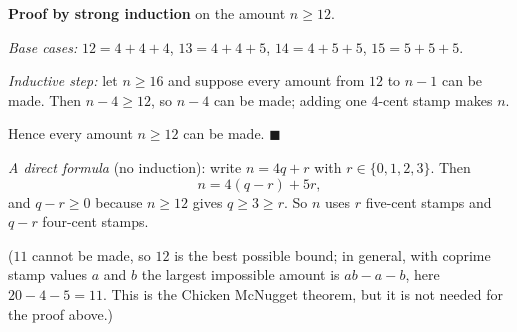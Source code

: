 \textbf{Proof by strong induction} on the amount $n\ge12$.

\emph{Base cases:} $12=4+4+4$, $13=4+4+5$, $14=4+5+5$, $15=5+5+5$.

\emph{Inductive step:} let $n\ge16$ and suppose every amount from $12$ to $n-1$ can be made. Then $n-4\ge12$, so $n-4$ can be made; adding one $4$-cent stamp makes $n$.

Hence every amount $n\ge12$ can be made. $\blacksquare$

\emph{A direct formula} (no induction): write $n=4q+r$ with $r\in\{0,1,2,3\}$. Then
\[
n=4(q-r)+5r,
\]
and $q-r\ge0$ because $n\ge12$ gives $q\ge3\ge r$. So $n$ uses $r$ five-cent stamps and $q-r$ four-cent stamps.

($11$ cannot be made, so $12$ is the best possible bound; in general, with coprime stamp values $a$ and $b$ the largest impossible amount is $ab-a-b$, here $20-4-5=11$. This is the Chicken McNugget theorem, but it is not needed for the proof above.)
